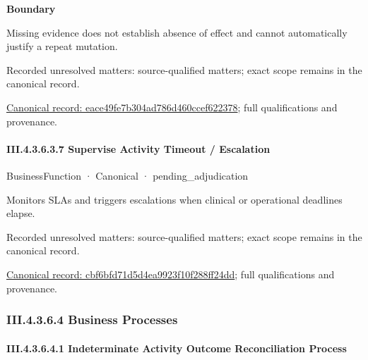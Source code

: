\textbf{Boundary}



Missing evidence does not establish absence of effect and cannot automatically justify a repeat mutation.


{\small Recorded unresolved matters: source-qualified matters; exact scope remains in the canonical record.}\par
{\footnotesize \href{../../../../continuum/business/business-function/eace49fe7b304ad786d460ccef622378.md}{Canonical record: eace49fe7b304ad786d460ccef622378}; full qualifications and provenance.}\par
\paragraph*{III.4.3.6.3.7 Supervise Activity Timeout / Escalation}
\label{navigation:III.4.3.6.3.7}

\label{element:cbf6bfd71d5d4ea9923f10f288ff24dd}
{\small BusinessFunction · Canonical · pending\_adjudication}\par

Monitors SLAs and triggers escalations when clinical or operational deadlines elapse.


{\small Recorded unresolved matters: source-qualified matters; exact scope remains in the canonical record.}\par
{\footnotesize \href{../../../../continuum/business/business-function/cbf6bfd71d5d4ea9923f10f288ff24dd.md}{Canonical record: cbf6bfd71d5d4ea9923f10f288ff24dd}; full qualifications and provenance.}\par
\subsubsection*{III.4.3.6.4 Business Processes}
\label{navigation:III.4.3.6.4}

\paragraph*{III.4.3.6.4.1 Indeterminate Activity Outcome Reconciliation Process}
\label{navigation:III.4.3.6.4.1}

